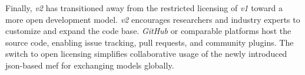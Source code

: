 Finally, \textit{v2} has transitioned away from the restricted licensing of \textit{v1} toward a more open development model. \textit{v2} encourages researchers and industry experts to customize and expand the code base. \textit{GitHub} or comparable platforms host the source code, enabling issue tracking, pull requests, and community plugins. The switch to open licensing simplifies collaborative usage of the newly introduced \acrshort{json}-based \acrshort{mef} for exchanging models globally.

\begin{comment}
The \textit{v2} update was driven by the need to improve openness, scalability, and solver flexibility. Three major goals encapsulate these objectives:
\begin{enumerate}
    \item \textbf{Architectural overhaul for extensibility and maintainability}, ensuring that new quantification methods or specialized back ends can be more easily integrated. 
    \item \textbf{Distributed computing and parallelization}, allowing a larger number of simultaneous analyses and more rigorous Monte Carlo sampling under high-throughput demands. 
    \item \textbf{Open-source licensing and community involvement}, encouraging collaboration from researchers and practitioners who can actively contribute domain-specific plug-ins or enhancements.
\end{enumerate}

\subsubsection{Architectural and Implementation Differences}
\subsubsection{Solver Integration and Model Exchange}
\subsubsection{Performance and Scalability Enhancements}
\end{comment}
